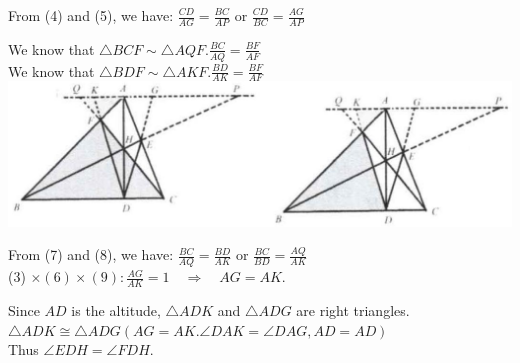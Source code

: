 \documentclass{article}
\begin{document}
From (4) and (5), we have: \(\frac{C D}{A G}=\frac{B C}{A P}\) or \(\frac{C D}{B C}=\frac{A G}{A P}\)

We know that \(\triangle B C F \sim \triangle A Q F . \frac{B C}{A Q}=\frac{B F}{A F}\)\\
We know that \(\triangle B D F \sim \triangle A K F . \frac{B D}{A K}=\frac{B F}{A F}\)\\
\centering
\includegraphics[width=\textwidth]{images/125.jpg}

From (7) and (8), we have: \(\frac{B C}{A Q}=\frac{B D}{A K}\) or \(\frac{B C}{B D}=\frac{A Q}{A K}\)\\
(3) \(\times(6) \times(9): \frac{A G}{A K}=1 \quad \Rightarrow \quad A G=A K\).

Since \(A D\) is the altitude, \(\triangle A D K\) and \(\triangle A D G\) are right triangles.\\
\(\triangle A D K \cong \triangle A D G(A G=A K . \angle D A K=\angle D A G, A D=A D)\)\\
Thus \(\angle E D H=\angle F D H\).
\end{document}
